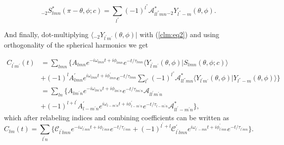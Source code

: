 \documentclass[11pt]{article}
\newcommand{\bra}[1]{\langle #1|}
\newcommand{\braket}[2]{\langle #1|#2\rangle}
\begin{document}
\begin{equation} \label{SlmnStar:expan}
{}_{\minus 2}S^{*}_{lmn}(\pi - \theta, \phi ;c) = \sum_{l^{''}} (-1)^{l^{''}}\mathcal{A}^{*}_{ll^{''}mn} {}_{\minus 2}Y_{l^{''}-m}(\theta, \phi).
\end{equation}

\noindent
And finally, dot-multiplying $\bra{{}_{\minus 2}Y_{l^{'}m^{'}}(\theta, \phi)}$ with (\ref{clm:eq2}) and using orthogonality of the spherical harmonics we get

\begin{equation}
\begin{aligned} \label{clm:eq3}
C_{l^{'}m^{'}}(t) & = \sum_{lmn} \Big\{ A_{lmn} e^{-i\omega_{lmn}t+i\phi_{lmn}}e^{-t/\tau_{lmn}} \braket{Y_{l^{'}m^{'}}(\theta, \phi)}{S_{lmn}(\theta, \phi ;c)}\\
& + (-1)^lA^{'}_{lmn} e^{i\omega_{lmn}t+i\phi^{'}_{lmn}}e^{-t/\tau_{lmn}} \sum_{l^{''}} (-1)^{l^{''}} \mathcal{A}^{*}_{ll^{''}mn} \braket{Y_{l^{'}m^{'}}(\theta, \phi)}{Y_{l^{''}-m}(\theta, \phi)} \Big\}\\
& = \sum_{ln} \Big\{ A_{lm^{'}n} e^{-i\omega_{lm^{'}n}t+i\phi_{lm^{'}n}}e^{-t/\tau_{lm^{'}n}} \mathcal{A}_{ll^{'}m^{'}n}\\
& + (-1)^{l + l^{'}} A^{'}_{l-m^{'}n} e^{i\omega_{l-m^{'}n}t+i\phi^{'}_{l-m^{'}n}}e^{-t/\tau_{l-m^{'}n}} \mathcal{A}^{*}_{ll^{'}-m^{'}n}  \Big\},
\end{aligned}
\end{equation}
which after relabeling indices and combining coefficients can be written as 
\begin{equation}
C_{lm}(t) = \sum_{l^{'}n} \Big\{ \mathcal{C}_{l^{'}lmn} e^{-i\omega_{l^{'}mn}t+i\phi_{l^{'}mn}}e^{-t/\tau_{l^{'}mn}} + (-1)^{l^{'}+l} \mathcal{C}^{'}_{l^{'}lmn} e^{i\omega_{l^{'}-mn}t+i\phi^{'}_{l^{'}mn}}e^{-t/\tau_{l^{'}mn}} \Big\}.
\end{equation}
\end{document}
